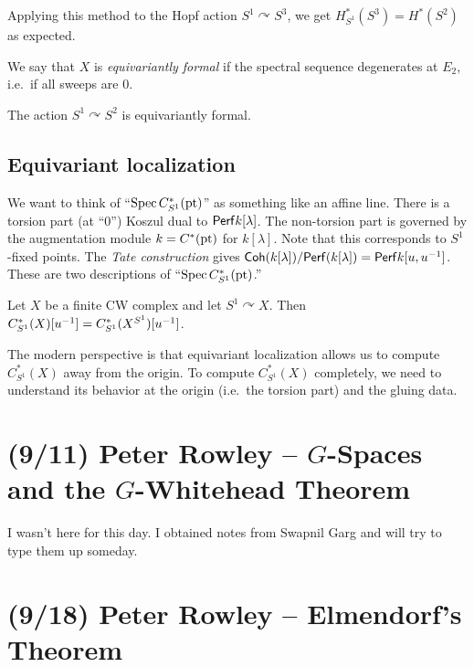 \documentclass{article}
\begin{document}
\begin{ex}
  Applying this method to the Hopf action $S^1 \curvearrowright S^3$, we get $H^*_{S^1}(S^3) = H^*(S^2)$ as expected.
\end{ex}

We say that $X$ is \emph{equivariantly formal} if the spectral sequence degenerates at $E_2$, i.e.\ if all sweeps are $0$.

\begin{ex}
  The action $S^1 \curvearrowright S^2$ is equivariantly formal.
\end{ex}

\subsection{Equivariant localization}

We want to think of ``$\operatorname{Spec} C^*_{S^1}(\operatorname{pt})$'' as something like an affine line.
There is a torsion part (at ``$0$'') Koszul dual to $\mathsf{Perf} k[\lambda]$.
The non-torsion part is governed by the augmentation module $k = C^*(\operatorname{pt})$ for $k[\lambda]$.
Note that this corresponds to $S^1$-fixed points.
The \emph{Tate construction} gives $\mathsf{Coh}(k[\lambda]) / \mathsf{Perf}(k[\lambda]) = \mathsf{Perf} k[u, u^{-1}]$.
These are two descriptions of ``$\operatorname{Spec} C^*_{S^1}(\operatorname{pt})$.''

\begin{thm}
  Let $X$ be a finite CW complex and let $S^1 \curvearrowright X$.
  Then $C^*_{S^1}(X)[u^{-1}] = C^*_{S^1}(X^{S^1})[u^{-1}]$.
\end{thm}

The modern perspective is that equivariant localization allows us to compute $C^*_{S^1}(X)$ away from the origin.
To compute $C^*_{S^1}(X)$ completely, we need to understand its behavior at the origin (i.e.\ the torsion part) and the gluing data.

\section{(9/11) Peter Rowley -- $G$-Spaces and the $G$-Whitehead Theorem}

I wasn't here for this day.
I obtained notes from Swapnil Garg and will try to type them up someday.

\section{(9/18) Peter Rowley -- Elmendorf's Theorem}
\end{document}
